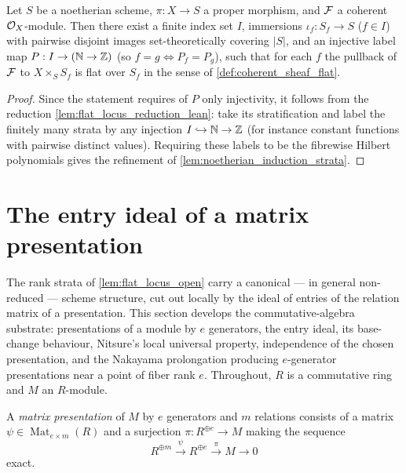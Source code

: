 \begin{lemma}\leanok
  \label{lem:flat_locus_assembly_lean}
  Let \(S\) be a noetherian scheme, \(\pi : X \to S\) a proper morphism,
  and \(\mathcal{F}\) a coherent \(\mathcal{O}_X\)-module. Then there exist a finite index set
  \(I\), immersions \(\iota_f : S_f \to S\) (\(f \in I\)) with pairwise disjoint
  images set-theoretically covering \(|S|\), and an injective label map
  \(P : I \to (\mathbb{N} \to \mathbb{Z})\) (so \(f = g \iff P_f = P_g\)), such that for
  each \(f\) the pullback of \(\mathcal{F}\) to \(X \times_S S_f\) is flat over \(S_f\) in
  the sense of \cref{def:coherent_sheaf_flat}.
\end{lemma}

\begin{proof}
  \leanok
  Since the statement requires of \(P\) only injectivity, it follows from the
  reduction \cref{lem:flat_locus_reduction_lean}: take its stratification and
  label the finitely many strata by any injection
  \(I \hookrightarrow \mathbb{N} \to \mathbb{Z}\) (for instance constant functions
  with pairwise distinct values).  Requiring these labels to be the fibrewise
  Hilbert polynomials gives the refinement of
  \cref{lem:noetherian_induction_strata}.
\end{proof}

\section{The entry ideal of a matrix presentation}
\label{sec:entry_ideal}

The rank strata of \cref{lem:flat_locus_open} carry a canonical --- in
general non-reduced --- scheme structure, cut out locally by the ideal of
entries of the relation matrix of a presentation.  This section develops the
commutative-algebra substrate: presentations of a module by \(e\)
generators, the entry ideal, its base-change behaviour, Nitsure's local
universal property, independence of the chosen presentation, and the
Nakayama prolongation producing \(e\)-generator presentations near a point
of fiber rank \(e\).  Throughout, \(R\) is a commutative ring and \(M\) an
\(R\)-module.

\begin{definition}
  \label{def:matrix_presentation}
  \leanok
  A \emph{matrix presentation} of \(M\) by \(e\) generators and \(m\)
  relations consists of a matrix
  \(\psi \in \operatorname{Mat}_{e \times m}(R)\) and a surjection
  \(\pi : R^{\oplus e} \to M\) making the sequence
  \[
    R^{\oplus m} \xrightarrow{\ \psi\ } R^{\oplus e}
      \xrightarrow{\ \pi\ } M \to 0
  \]
  exact.
\end{definition}

